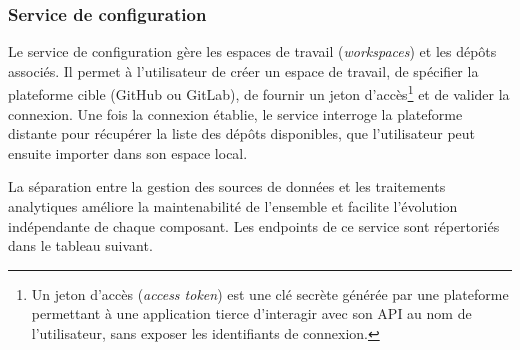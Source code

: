 \subsubsection{Service de configuration}

Le service de configuration gère les espaces de travail (\textit{workspaces}) et les dépôts associés. Il permet à
l'utilisateur de créer un espace de travail, de spécifier la plateforme cible (GitHub ou GitLab),
de fournir un jeton d'accès\footnote{Un jeton d'accès (\textit{access token}) est une clé secrète
générée par une plateforme permettant à une application tierce d'interagir avec son API au nom de
l'utilisateur, sans exposer les identifiants de connexion.} et de valider la connexion. Une fois
la connexion établie, le service interroge la plateforme distante pour récupérer la liste des
dépôts disponibles, que l'utilisateur peut ensuite importer dans son espace local.

La séparation entre la gestion des sources de données et les traitements analytiques améliore la
maintenabilité de l'ensemble et facilite l'évolution indépendante de chaque composant. Les
endpoints de ce service sont répertoriés dans le tableau suivant.

